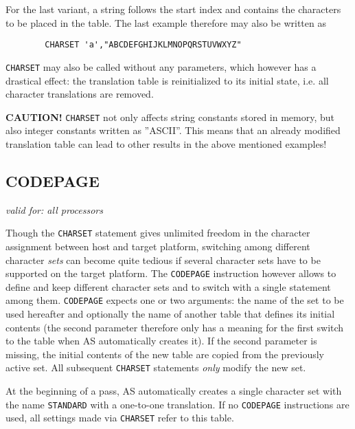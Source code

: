 \documentclass[12pt,twoside]{report}
\makeatletter
\newcommand{\bb}[1]{{\bf #1}}
\newcommand{\tty}[1]{{\tt #1}}
\newcommand{\ttindex}[1]{\index{#1@{\tt #1}}}
\makeatother
\begin{document}
For the last variant, a string follows the start index and contains the
characters to be placed in the table.  The last example therefore may also
be written as
\begin{verbatim}
        CHARSET 'a',"ABCDEFGHIJKLMNOPQRSTUVWXYZ"
\end{verbatim}

\tty{CHARSET} may also be called without any parameters, which however has
a drastical effect: the translation table is reinitialized to its initial
state, i.e. all character translations are removed.

\bb{CAUTION!} \tty{CHARSET} not only affects string constants stored in
memory, but also integer constants written as ''ASCII''. This means that
an already modified translation table can lead to other results in the
above mentioned examples!


\subsection{CODEPAGE}
\ttindex{CODEPAGE}

{\em valid for: all processors}

Though the \tty{CHARSET} statement gives unlimited freedom in the
character assignment between host and target platform, switching among
different character {\em sets} can become quite tedious if several
character sets have to be supported on the target platform.  The
\tty{CODEPAGE} instruction however allows to define and keep different
character sets and to switch with a single statement among them.
\tty{CODEPAGE} expects one or two arguments: the name of the set to be
used hereafter and optionally the name of another table that defines its
initial contents (the second parameter therefore only has a meaning for
the first switch to the table when AS automatically creates it).  If the
second parameter is missing, the initial contents of the new table are
copied from the previously active set.  All subsequent \tty{CHARSET}
statements {\em only} modify the new set.

At the beginning of a pass, AS automatically creates a single character
set with the name \tty{STANDARD} with a one-to-one translation.  If no
\tty{CODEPAGE} instructions are used, all settings made via \tty{CHARSET}
refer to this table.

\end{document}
